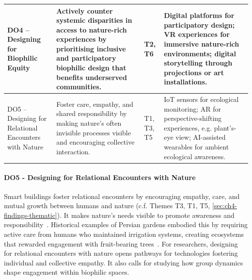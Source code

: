 \begin{longtable}{@{}p{.22\linewidth} p{.33\linewidth} p{.11\linewidth} p{.24\linewidth}@{}}
DO4 -- Designing for Biophilic Equity &
Actively counter systemic disparities in access to nature-rich experiences by prioritising inclusive and participatory biophilic design that benefits underserved communities. &
T2, T6 &
Digital platforms for participatory design; VR experiences for immersive nature-rich environments; digital storytelling through projections or art installations.\\
\midrule

DO5 -- Designing for Relational Encounters with Nature &
Foster care, empathy, and shared responsibility by making nature's often invisible processes visible and encouraging collective interaction. &
T1, T3, T5 &
IoT sensors for ecological monitoring; AR for perspective-shifting experiences, e.g. plant's-eye view; AI-assisted wearables for ambient ecological awareness.\\

\end{longtable}
\endgroup

\paragraph{DO5 - Designing for Relational Encounters with Nature}
Smart buildings foster relational encounters by encouraging empathy, care, and mutual growth between humans and nature (c.f. Themes T3, T1, T5, \autoref{sec:ch4-findings-thematic}). It makes nature’s needs visible to promote awareness and responsibility~\cite{flanagan2018rewilding, li2022re}. Historical examples of Persian gardens embodied this by requiring active care from humans who maintained irrigation systems, creating ecosystems that rewarded engagement with fruit-bearing trees~\cite{khalilnezhad2016productive, khalilnezhad2024edible}. For researchers, designing for relational encounters with nature opens pathways for technologies fostering individual and collective empathy. It also calls for studying how group dynamics shape engagement within biophilic spaces.


